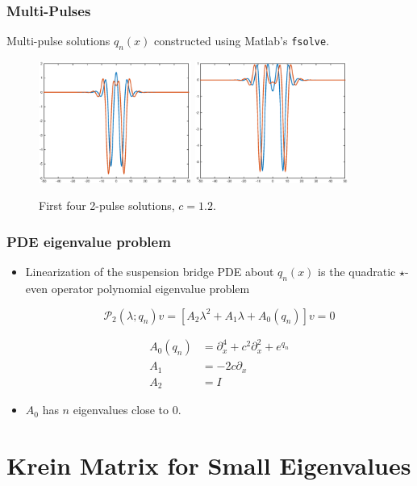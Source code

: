 \documentclass[16pt]{beamer}
\newcommand{\calP}{\mathcal{P}}
\begin{document}
\begin{frame}
\frametitle{Multi-Pulses} 
    Multi-pulse solutions $q_n(x)$ constructed using Matlab's \texttt{fsolve}.
    \begin{figure}
    \begin{center}
    \includegraphics[width=5cm]{images/double12_12.eps}
    \includegraphics[width=5cm]{images/double12_34.eps}
    \caption{First four 2-pulse solutions, $c = 1.2$.}
    \end{center}
    \end{figure}
\end{frame}

\begin{frame}
\frametitle{PDE eigenvalue problem} 

	\begin{itemize}
	\item Linearization of the suspension bridge PDE about $q_n(x)$ is the quadratic $\star$-even operator polynomial eigenvalue problem

    \[ \calP_2(\lambda; q_n)v = [A_2 \lambda^2 + A_1 \lambda + A_0(q_n)]v = 0 \]

    \begin{align*}
    A_0(q_n) &= \partial_x^4 + c^2 \partial_x^2 + e^{q_n} \\
    A_1 &= -2 c \partial_x \\
    A_2 &= I
    \end{align*}

    \item $A_0$ has $n$ eigenvalues close to 0.
	\end{itemize}
\end{frame}

\section{Krein Matrix for Small Eigenvalues}
\end{document}
